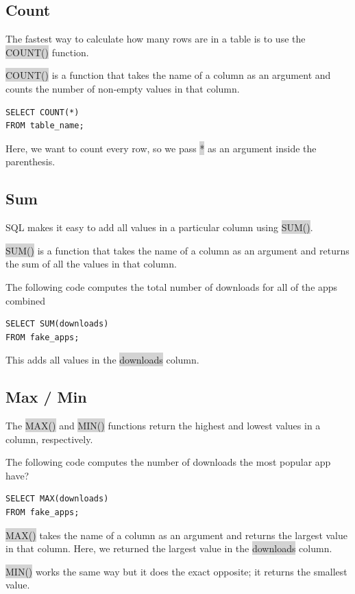 \documentclass[11pt]{article}
\begin{document}
{{\subsection{Count}
The fastest way to calculate how many rows are in a table is to use the \colorbox{lightgray}{COUNT()} function.

\colorbox{lightgray}{COUNT()} is a function that takes the name of a column as an argument and counts the number of non-empty values in that column.
\begin{lstlisting}
SELECT COUNT(*)
FROM table_name;
\end{lstlisting}
Here, we want to count every row, so we pass \colorbox{lightgray}{*} as an argument inside the parenthesis.

\subsection{Sum}
SQL makes it easy to add all values in a particular column using \colorbox{lightgray}{SUM()}.

\colorbox{lightgray}{SUM()} is a function that takes the name of a column as an argument and returns the sum of all the values in that column.

The following code computes the total number of downloads for all of the apps combined
\begin{lstlisting}
SELECT SUM(downloads)
FROM fake_apps;
\end{lstlisting}
This adds all values in the \colorbox{lightgray}{downloads} column.

\subsection{Max / Min}
The \colorbox{lightgray}{MAX()} and \colorbox{lightgray}{MIN()} functions return the highest and lowest values in a column, respectively.

The following code computes the number of downloads the most popular app have?
\begin{lstlisting}
SELECT MAX(downloads)
FROM fake_apps;
\end{lstlisting}
\colorbox{lightgray}{MAX()} takes the name of a column as an argument and returns the largest value in that column. Here, we returned the largest value in the \colorbox{lightgray}{downloads} column.

\colorbox{lightgray}{MIN()} works the same way but it does the exact opposite; it returns the smallest value.

}}
\end{document}
